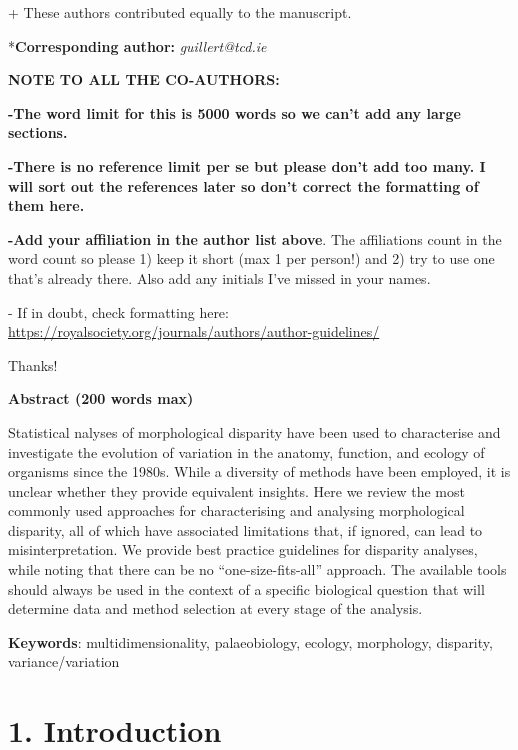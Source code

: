 + These authors contributed equally to the manuscript.

*\textbf{Corresponding author:} \emph{guillert@tcd.ie}

\textbf{NOTE TO ALL THE CO-AUTHORS:}

\textbf{-The word limit for this is 5000 words so we can't add any large
sections.}

\textbf{-There is no reference limit per se but please don't add too
many. I will sort out the references later so don't correct the
formatting of them here.}

\textbf{-Add your affiliation in the author list above}. The
affiliations count in the word count so please 1) keep it short (max 1
per person!) and 2) try to use one that's already there. Also add any
initials I've missed in your names.

- If in doubt, check formatting here:
\href{https://royalsociety.org/journals/authors/author-guidelines/}{{https://royalsociety.org/journals/authors/author-guidelines/}}

Thanks!

\textbf{Abstract (200 words max)}

Statistical nalyses of morphological disparity have been used to
characterise and investigate the evolution of variation in the anatomy,
function, and ecology of organisms since the 1980s. While a diversity of
methods have been employed, it is unclear whether they provide
equivalent insights. Here we review the most commonly used approaches
for characterising and analysing morphological disparity, all of which
have associated limitations that, if ignored, can lead to
misinterpretation. We provide best practice guidelines for disparity
analyses, while noting that there can be no ``one-size-fits-all''
approach. The available tools should always be used in the context of a
specific biological question that will determine data and method
selection at every stage of the analysis.

\textbf{Keywords}: multidimensionality, palaeobiology, ecology,
morphology, disparity, variance/variation

\hypertarget{introduction}{%
\section{1. Introduction}\label{introduction}}

